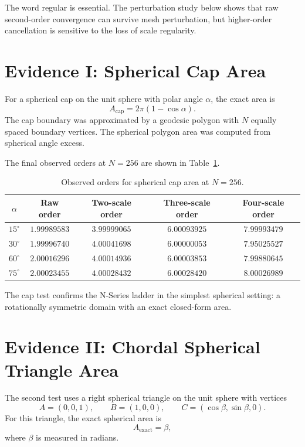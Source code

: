 \documentclass[11pt]{article}
\begin{document}
\medskip

The word regular is essential.  The perturbation study below shows that raw
second-order convergence can survive mesh perturbation, but higher-order
cancellation is sensitive to the loss of scale regularity.

\section{Evidence I: Spherical Cap Area}

For a spherical cap on the unit sphere with polar angle $\alpha$, the exact
area is
\[
  A_{\mathrm{cap}}
  =
  2\pi(1-\cos\alpha).
\]
The cap boundary was approximated by a geodesic polygon with $N$ equally
spaced boundary vertices.  The spherical polygon area was computed from
spherical angle excess.

The final observed orders at $N=256$ are shown in
Table~\ref{tab:cap-orders}.

\begin{table}[ht]
\centering
\small
\begin{tabular}{ccccc}
\toprule
$\alpha$ & Raw order & Two-scale order & Three-scale order & Four-scale order \\
\midrule
$15^\circ$ & $1.99989583$ & $3.99999065$ & $6.00093925$ & $7.99993479$ \\
$30^\circ$ & $1.99996740$ & $4.00041698$ & $6.00000053$ & $7.95025527$ \\
$60^\circ$ & $2.00016296$ & $4.00014936$ & $6.00003853$ & $7.99880645$ \\
$75^\circ$ & $2.00023455$ & $4.00028432$ & $6.00028420$ & $8.00026989$ \\
\bottomrule
\end{tabular}
\caption{Observed orders for spherical cap area at $N=256$.}
\label{tab:cap-orders}
\end{table}

The cap test confirms the N-Series ladder in the simplest spherical setting:
a rotationally symmetric domain with an exact closed-form area.

\section{Evidence II: Chordal Spherical Triangle Area}

The second test uses a right spherical triangle on the unit sphere with
vertices
\[
  A=(0,0,1),
  \qquad
  B=(1,0,0),
  \qquad
  C=(\cos\beta,\sin\beta,0).
\]
For this triangle, the exact spherical area is
\[
  A_{\mathrm{exact}}=\beta,
\]
where $\beta$ is measured in radians.
\end{document}
